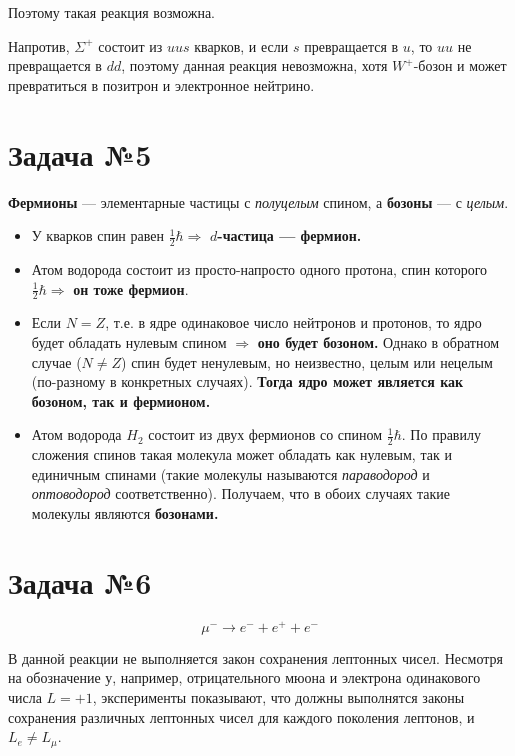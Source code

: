 \documentclass[12pt]{urticle}
\newcommand{\te}{\ensuremath{\Rightarrow}}
\newcommand{\st}{\ensuremath{\longrightarrow}}
\begin{document}
Поэтому такая реакция возможна.

Напротив, $ \Sigma^+ $ состоит из $ uus $ кварков, и если $ s $ превращается в $ u $, то $ uu $ не превращается в $ dd $, поэтому данная реакция невозможна, хотя $ W^+ $-бозон и может превратиться в позитрон и электронное нейтрино.

\section{Задача №5}

\textbf{Фермионы} --- элементарные частицы с \textit{полуцелым} спином, а\textbf{ бозоны} --- с \textit{целым}.

\begin{itemize}
	
	\item У кварков спин равен $ \frac12\hbar \te $  \textbf{$ d $-частица --- фермион.}
	
	\item Атом водорода состоит из просто-напросто одного протона, спин которого  $ \frac12\hbar \te $ \textbf{он тоже фермион}.
	
	\item Если $ N = Z $, т.е. в ядре одинаковое число нейтронов и протонов, то ядро будет обладать нулевым спином $ \te $ \textbf{оно будет бозоном.} Однако в обратном случае ($ N\neq Z$) спин будет ненулевым, но неизвестно, целым или нецелым (по-разному в конкретных случаях). \textbf{Тогда ядро может является как бозоном, так и фермионом.}
	
	\item Атом водорода $ H_2 $ состоит из двух фермионов со спином  $ \frac12\hbar  $. По правилу сложения спинов такая молекула может обладать как нулевым, так и единичным спинами (такие молекулы называются \textit{параводород} и \textit{оптоводород} соответственно). Получаем, что в обоих случаях такие молекулы являются \textbf{бозонами.}
		
\end{itemize}

\section{Задача №6}

\begin{equation}
\mu^- \st e^- + e^+ + e^-
\end{equation}

 В данной реакции не выполняется закон сохранения лептонных чисел. Несмотря на обозначение у, например, отрицательного мюона и электрона одинакового числа $L =  +1 $, эксперименты показывают, что должны выполнятся законы сохранения различных лептонных чисел для каждого поколения лептонов, и $ L_e \neq L_\mu $. 
 
\end{document}
